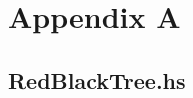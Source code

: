 \documentclass[12pt, a4paper]{article} %
\begin{document}
\newpage

\section*{Appendix A}\label{s:appendix-a}

\subsection*{RedBlackTree.hs}\label{s:redblacktree}

\inputminted{haskell}{../../Chapter3/RedBlackTree.hs}





\end{document}
